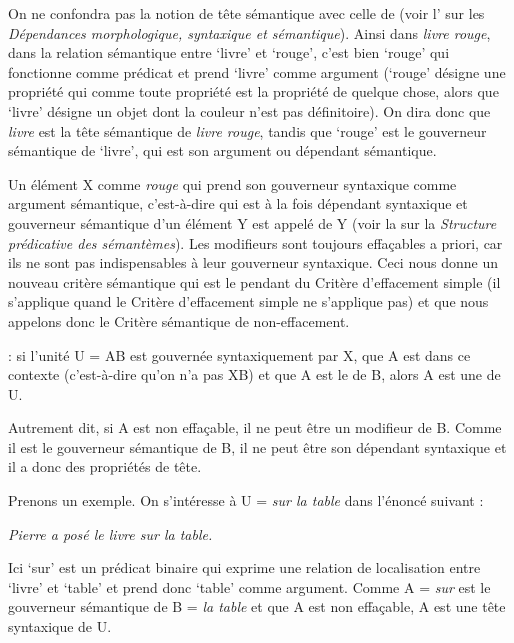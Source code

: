 On ne confondra pas la notion de tête sémantique avec celle de  (voir l’ sur les \textit{Dépendances morphologique, syntaxique et sémantique}). 
Ainsi dans \textit{livre rouge}, dans la relation sémantique entre ‘livre’ et ‘rouge’, c’est bien ‘rouge’ qui fonctionne comme prédicat et prend ‘livre’ comme argument (‘rouge’ désigne une propriété qui comme toute propriété est la propriété de quelque chose, alors que ‘livre’ désigne un objet dont la couleur n’est pas définitoire). On dira donc que \textit{livre} est la tête sémantique de \textit{livre rouge}, tandis que ‘rouge’ est le gouverneur sémantique de ‘livre’, qui est son argument ou dépendant sémantique.

Un élément X comme \textit{rouge} qui prend son gouverneur syntaxique comme argument sémantique, c’est-à-dire qui est à la fois dépendant syntaxique et gouverneur sémantique d’un élément Y est appelé  de Y (voir la  sur la \textit{Structure prédicative des sémantèmes}). Les modifieurs sont toujours effaçables a priori, car ils ne sont pas indispensables à leur gouverneur syntaxique. Ceci nous donne un nouveau critère sémantique qui est le pendant du Critère d’effacement simple (il s’applique quand le Critère d’effacement simple ne s’applique pas) et que nous appelons donc le Critère sémantique de non-effacement.

{: si l’unité U = AB est gouvernée syntaxiquement par X, que A est  dans ce contexte (c'est-à-dire qu'on n'a pas XB)
et que A est le  de B, alors A est une  de U.}

Autrement dit, si A est non effaçable, il ne peut être un modifieur de B. Comme il est le gouverneur sémantique de B, il ne peut être son dépendant syntaxique et il a donc des propriétés de tête.

Prenons un exemple. On s’intéresse à U = \textit{sur la table} dans l’énoncé suivant :

\ea \textit{Pierre a posé le livre sur la table.}\z

Ici ‘sur’ est un prédicat binaire qui exprime une relation de localisation entre ‘livre’ et ‘table’ et prend donc ‘table’ comme argument. Comme A = \textit{sur} est le gouverneur sémantique de B = \textit{la table} et que A est non effaçable, A est une tête syntaxique de U.\largerpage[2]

